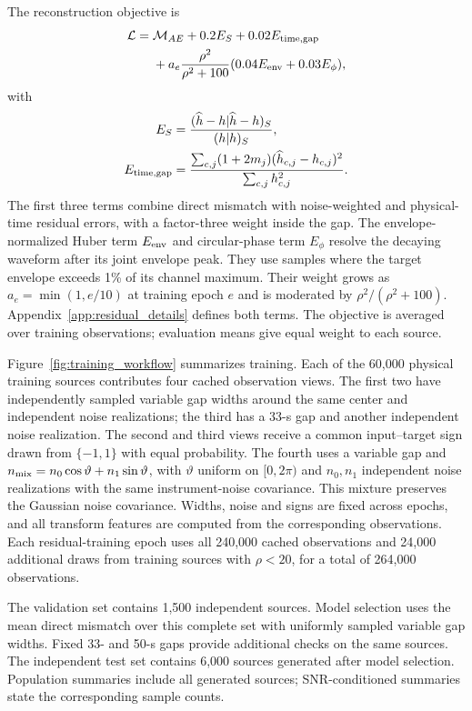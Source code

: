 \documentclass[10pt,prd,aps,a4paper,twocolumn,superscriptaddress,nofootinbib,floatfix]{revtex4-2}
\begin{document}
The reconstruction objective is
\begin{equation}
\begin{split}
\mathcal L={}&\mathcal M_{AE}+0.2E_S+0.02E_{\rm time,gap}\\
&+a_e\frac{\rho^2}{\rho^2+100}(0.04E_{\rm env}+0.03E_\phi),
\end{split}\label{eq:loss}
\end{equation}
with
\begin{align}
E_S&=\frac{(\widehat h-h|\widehat h-h)_S}{(h|h)_S},\nonumber\\
E_{\rm time,gap}&=\frac{\sum_{c,j}(1+2m_j)(\widehat h_{c,j}-h_{c,j})^2}{\sum_{c,j}h_{c,j}^2}.\label{eq:auxiliary_errors}
\end{align}
The first three terms combine direct mismatch with noise-weighted and physical-time residual errors, with a factor-three weight inside the gap. The envelope-normalized Huber term $E_{\rm env}$ and circular-phase term $E_\phi$ resolve the decaying waveform after its joint envelope peak. They use samples where the target envelope exceeds 1\% of its channel maximum. Their weight grows as $a_e=\min(1,e/10)$ at training epoch $e$ and is moderated by $\rho^2/(\rho^2+100)$. Appendix~\ref{app:residual_details} defines both terms. The objective is averaged over training observations; evaluation means give equal weight to each source.

Figure~\ref{fig:training_workflow} summarizes training. Each of the 60,000 physical training sources contributes four cached observation views. The first two have independently sampled variable gap widths around the same center and independent noise realizations; the third has a 33-s gap and another independent noise realization. The second and third views receive a common input--target sign drawn from $\{-1,1\}$ with equal probability. The fourth uses a variable gap and $n_{\rm mix}=n_0\cos\vartheta+n_1\sin\vartheta$, with $\vartheta$ uniform on $[0,2\pi)$ and $n_0,n_1$ independent noise realizations with the same instrument-noise covariance. This mixture preserves the Gaussian noise covariance. Widths, noise and signs are fixed across epochs, and all transform features are computed from the corresponding observations. Each residual-training epoch uses all 240,000 cached observations and 24,000 additional draws from training sources with $\rho<20$, for a total of 264,000 observations.

The validation set contains 1,500 independent sources. Model selection uses the mean direct mismatch over this complete set with uniformly sampled variable gap widths. Fixed 33- and 50-s gaps provide additional checks on the same sources. The independent test set contains 6,000 sources generated after model selection. Population summaries include all generated sources; SNR-conditioned summaries state the corresponding sample counts.
\end{document}
